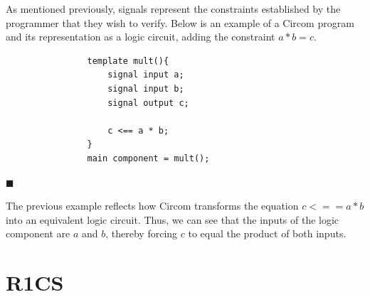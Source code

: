 \documentclass[a4paper,12pt]{report}
\begin{document}
	
	\vspace{0.3cm}
	\vspace{0.5cm}
	
	\noindent As mentioned previously, signals represent the constraints established by the programmer that they wish to verify. Below is an example of a Circom program and its representation as a logic circuit, adding the constraint $a*b=c$.
	
	\begin{mi_ejemplo}[H]\centering\begin{minipage}{0.55\textwidth}\lstset{
				language=Circom,
				basicstyle=\footnotesize\ttfamily,
				frame=single,
				breaklines=true}
			\begin{lstlisting}
				template mult(){
					signal input a;
					signal input b;
					signal output c;
					
					c <== a * b;
				}
				main component = mult();
			\end{lstlisting}
		\end{minipage}
		\hfill
		
		\begin{minipage}{0.45\textwidth}
			\centering
		\end{minipage}
		
		\caption{Comparative illustration of code vs. circuit}
		\label{ex:varA-dist-zero-ingles}
		
		\hspace*{\fill} $\blacksquare$
	\end{mi_ejemplo}\vspace{0.2cm}\noindent The previous example reflects how Circom transforms the equation $c<==a*b$ into an equivalent logic circuit. Thus, we can see that the inputs of the logic component are $a$ and $b$, thereby forcing $c$ to equal the product of both inputs.
	
	\section{R1CS}
	\label{sec:r1cs-ingles}
	
\end{document}
